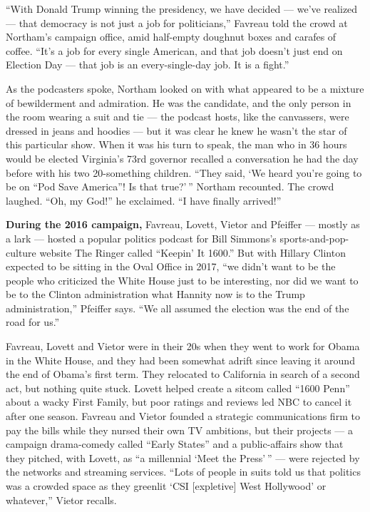 ``With Donald Trump winning the presidency, we have decided --- we've
realized --- that democracy is not just a job for politicians,'' Favreau
told the crowd at Northam's campaign office, amid half-empty doughnut
boxes and carafes of coffee. ``It's a job for every single American, and
that job doesn't just end on Election Day --- that job is an
every-single-day job. It is a fight.''

As the podcasters spoke, Northam looked on with what appeared to be a
mixture of bewilderment and admiration. He was the candidate, and the
only person in the room wearing a suit and tie --- the podcast hosts,
like the canvassers, were dressed in jeans and hoodies --- but it was
clear he knew he wasn't the star of this particular show. When it was
his turn to speak, the man who in 36 hours would be elected Virginia's
73rd governor recalled a conversation he had the day before with his two
20-something children. ``They said, `We heard you're going to be on
``Pod Save America''! Is that true?' '' Northam recounted. The crowd
laughed. ``Oh, my God!'' he exclaimed. ``I have finally arrived!''

\textbf{During the 2016 campaign,} Favreau, Lovett, Vietor and Pfeiffer
--- mostly as a lark --- hosted a popular politics podcast for Bill
Simmons's sports-and-pop-culture website The Ringer called ``Keepin' It
1600.'' But with Hillary Clinton expected to be sitting in the Oval
Office in 2017, ``we didn't want to be the people who criticized the
White House just to be interesting, nor did we want to be to the Clinton
administration what Hannity now is to the Trump administration,''
Pfeiffer says. ``We all assumed the election was the end of the road for
us.''

Favreau, Lovett and Vietor were in their 20s when they went to work for
Obama in the White House, and they had been somewhat adrift since
leaving it around the end of Obama's first term. They relocated to
California in search of a second act, but nothing quite stuck. Lovett
helped create a sitcom called ``1600 Penn'' about a wacky First Family,
but poor ratings and reviews led NBC to cancel it after one season.
Favreau and Vietor founded a strategic communications firm to pay the
bills while they nursed their own TV ambitions, but their projects --- a
campaign drama-comedy called ``Early States'' and a public-affairs show
that they pitched, with Lovett, as ``a millennial `Meet the Press' ''
--- were rejected by the networks and streaming services. ``Lots of
people in suits told us that politics was a crowded space as they
greenlit `CSI {[}expletive{]} West Hollywood' or whatever,'' Vietor
recalls.

